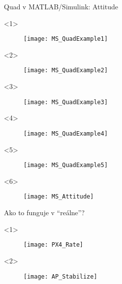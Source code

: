 \begin{frame}{Quad v MATLAB/Simulink: Attitude}
\begin{onlyenv}<1>
  \begin{figure}
\centering
\texttt{[image: MS\_QuadExample1]}\\
\end{figure}
\end{onlyenv}

\begin{onlyenv}<2>
\begin{figure}
\centering
\texttt{[image: MS\_QuadExample2]}\\
\end{figure}
\end{onlyenv}

\begin{onlyenv}<3>
\begin{figure}
\centering
\texttt{[image: MS\_QuadExample3]}\\
\end{figure}
\end{onlyenv}


\begin{onlyenv}<4>
\begin{figure}
\centering
\texttt{[image: MS\_QuadExample4]}\\
\end{figure}
\end{onlyenv}

\begin{onlyenv}<5>
\begin{figure}
\centering
\texttt{[image: MS\_QuadExample5]}\\
\end{figure}
\end{onlyenv}


\begin{onlyenv}<6>
\begin{figure}
\centering
\texttt{[image: MS\_Attitude]}\\
\end{figure}
\end{onlyenv}

\end{frame}


\begin{frame}{Ako to funguje v ``reálne''?}
\begin{onlyenv}<1>
  \begin{figure}
\centering
  \texttt{[image: PX4\_Rate]}\\
\end{figure}
\end{onlyenv}

\begin{onlyenv}<2>
  \begin{figure}
\centering
  \texttt{[image: AP\_Stabilize]}\\
\end{figure}
\end{onlyenv}


\end{frame}


